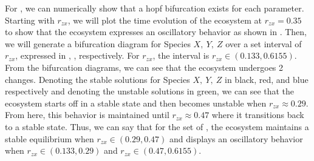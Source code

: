 For , we can numerically show that a hopf bifurcation exists for each parameter. Starting with $r_{zx}$, we will plot the time evolution of the ecosystem at $r_{zx}=0.35$ to show that the ecosystem expresses an oscillatory behavior as shown in . Then, we will generate a bifurcation diagram for Species $X,\ Y,\ Z$ over a set interval of $r_{zx}$, expressed in , ,  respectively. For $r_{zx}$, the interval is $r_{zx}\in(0.133,0.6155)$. From the bifurcation diagrams, we can see that the ecosystem undergoes 2 changes. Denoting the stable solutions for Species $X,\ Y,\ Z$ in black, red, and blue respectively and denoting the unstable solutions in green, we can see that the ecosystem starts off in a stable state and then becomes unstable when $r_{zx}\approx 0.29$. From here, this behavior is maintained until $r_{zx}\approx 0.47$ where it transitions back to a stable state. Thus, we can say that for the set of , the ecosystem maintains a stable equilibrium when $r_{zx}\in(0.29,0.47)$ and displays an oscillatory behavior when $r_{zx}\in(0.133,0.29)$ and $r_{zx}\in(0.47,0.6155)$.

